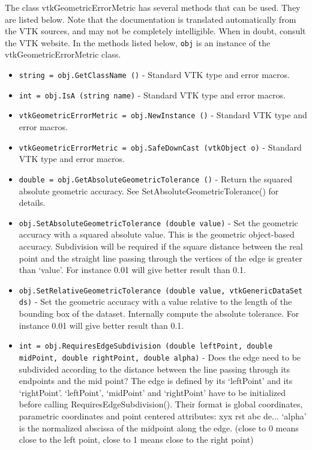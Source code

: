 The class vtkGeometricErrorMetric has several methods that can be used.
  They are listed below.
Note that the documentation is translated automatically from the VTK sources,
and may not be completely intelligible.  When in doubt, consult the VTK website.
In the methods listed below, \verb|obj| is an instance of the vtkGeometricErrorMetric class.
\begin{itemize}
\item  \verb|string = obj.GetClassName ()| -  Standard VTK type and error macros.

\item  \verb|int = obj.IsA (string name)| -  Standard VTK type and error macros.

\item  \verb|vtkGeometricErrorMetric = obj.NewInstance ()| -  Standard VTK type and error macros.

\item  \verb|vtkGeometricErrorMetric = obj.SafeDownCast (vtkObject o)| -  Standard VTK type and error macros.

\item  \verb|double = obj.GetAbsoluteGeometricTolerance ()| -  Return the squared absolute geometric accuracy. See
 SetAbsoluteGeometricTolerance() for details.
 

\item  \verb|obj.SetAbsoluteGeometricTolerance (double value)| -  Set the geometric accuracy with a squared absolute value.
 This is the geometric object-based accuracy.
 Subdivision will be required if the square distance between the real
 point and the straight line passing through the vertices of the edge is
 greater than `value'. For instance 0.01 will give better result than 0.1.
 

\item  \verb|obj.SetRelativeGeometricTolerance (double value, vtkGenericDataSet ds)| -  Set the geometric accuracy with a value relative to the length of the
 bounding box of the dataset. Internally compute the absolute tolerance.
 For instance 0.01 will give better result than 0.1.
 
 

\item  \verb|int = obj.RequiresEdgeSubdivision (double leftPoint, double midPoint, double rightPoint, double alpha)| -  Does the edge need to be subdivided according to the distance between
 the line passing through its endpoints and the mid point?
 The edge is defined by its `leftPoint' and its `rightPoint'.
 `leftPoint', `midPoint' and `rightPoint' have to be initialized before
 calling RequiresEdgeSubdivision().
 Their format is global coordinates, parametric coordinates and
 point centered attributes: xyx rst abc de...
 `alpha' is the normalized abscissa of the midpoint along the edge.
 (close to 0 means close to the left point, close to 1 means close to the
 right point)
 

\end{itemize}
